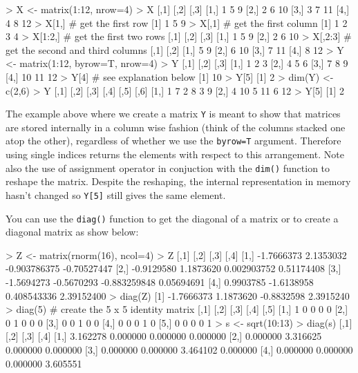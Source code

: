 \begin{R}
> X <- matrix(1:12, nrow=4)
> X
     [,1] [,2] [,3]
[1,]    1    5    9
[2,]    2    6   10
[3,]    3    7   11
[4,]    4    8   12
> X[1,] # get the first row
[1] 1 5 9
> X[,1] # get the first column
[1] 1 2 3 4
> X[1:2,] # get the first two rows
     [,1] [,2] [,3]
[1,]    1    5    9
[2,]    2    6   10
> X[,2:3] # get the second and third columns
     [,1] [,2]
[1,]    5    9
[2,]    6   10
[3,]    7   11
[4,]    8   12
> Y <- matrix(1:12, byrow=T, nrow=4)
> Y
     [,1] [,2] [,3]
[1,]    1    2    3
[2,]    4    5    6
[3,]    7    8    9
[4,]   10   11   12
> Y[4] # see explanation below
[1] 10
> Y[5]
[1] 2
> dim(Y) <- c(2,6)
> Y
     [,1] [,2] [,3] [,4] [,5] [,6]
[1,]    1    7    2    8    3    9
[2,]    4   10    5   11    6   12
> Y[5]
[1] 2
\end{R}
The example above where we create a matrix \lstinline!Y! is meant to
show that matrices are stored internally in a column wise fashion (think
of the columns stacked one atop the other), regardless of whether we use
the \lstinline!byrow=T! argument. Therefore using single indices returns
the elements with respect to this arrangement. Note also the use of
assignment operator in conjuction with the \lstinline!dim()! function to
reshape the matrix. Despite the reshaping, the internal representation
in memory hasn't changed so \lstinline!Y[5]! still gives the same
element.

You can use the \lstinline!diag()! function to get the diagonal of a
matrix or to create a diagonal matrix as show below:

\begin{R}
> Z <- matrix(rnorm(16), ncol=4)
> Z
           [,1]       [,2]         [,3]        [,4]
[1,] -1.7666373  2.1353032 -0.903786375 -0.70527447
[2,] -0.9129580  1.1873620  0.002903752  0.51174408
[3,] -1.5694273 -0.5670293 -0.883259848  0.05694691
[4,]  0.9903785 -1.6138958  0.408543336  2.39152400
> diag(Z)
[1] -1.7666373  1.1873620 -0.8832598  2.3915240
> diag(5) # create the 5 x 5 identity matrix
     [,1] [,2] [,3] [,4] [,5]
[1,]    1    0    0    0    0
[2,]    0    1    0    0    0
[3,]    0    0    1    0    0
[4,]    0    0    0    1    0
[5,]    0    0    0    0    1
> s <- sqrt(10:13)
> diag(s)
         [,1]     [,2]     [,3]     [,4]
[1,] 3.162278 0.000000 0.000000 0.000000
[2,] 0.000000 3.316625 0.000000 0.000000
[3,] 0.000000 0.000000 3.464102 0.000000
[4,] 0.000000 0.000000 0.000000 3.605551
\end{R}

